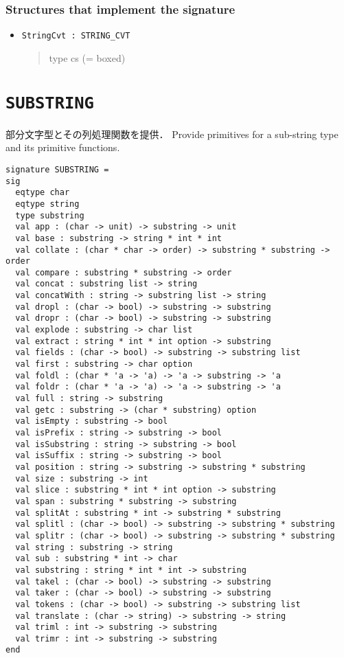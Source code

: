 \documentclass{jbook}
\newcommand{\txt}[2]{#2}
\newcommand{\code}[1]{\mbox{\large\tt #1}}
\newenvironment{program}{\begin{quote}\begin{tt}}%
                        {\end{tt}\end{quote}}
\newcommand{\signature}[2]{
\section{{\tt #1}}\label{section:reference:#2}
}
\newcommand{\Structure}{\subsubsection*{\txt{シグネチャを実装するストラクチャ}{Structures that implement the signature}}}
\begin{document}
\Structure
\begin{itemize}
\item \code{StringCvt : STRING\_CVT}
\begin{program}
    type cs (= boxed)
\end{program}
\end{itemize}

\signature{SUBSTRING}{SUBSTRING}
\ifjp%
	部分文字型とその列処理関数を提供．
\else%
	Provide primitives for a sub-string type and its primitive functions.
\fi%
\begin{verbatim}
signature SUBSTRING =
sig
  eqtype char
  eqtype string
  type substring
  val app : (char -> unit) -> substring -> unit
  val base : substring -> string * int * int
  val collate : (char * char -> order) -> substring * substring -> order
  val compare : substring * substring -> order
  val concat : substring list -> string
  val concatWith : string -> substring list -> string
  val dropl : (char -> bool) -> substring -> substring
  val dropr : (char -> bool) -> substring -> substring
  val explode : substring -> char list
  val extract : string * int * int option -> substring
  val fields : (char -> bool) -> substring -> substring list
  val first : substring -> char option
  val foldl : (char * 'a -> 'a) -> 'a -> substring -> 'a
  val foldr : (char * 'a -> 'a) -> 'a -> substring -> 'a
  val full : string -> substring
  val getc : substring -> (char * substring) option
  val isEmpty : substring -> bool
  val isPrefix : string -> substring -> bool
  val isSubstring : string -> substring -> bool
  val isSuffix : string -> substring -> bool
  val position : string -> substring -> substring * substring
  val size : substring -> int
  val slice : substring * int * int option -> substring
  val span : substring * substring -> substring
  val splitAt : substring * int -> substring * substring
  val splitl : (char -> bool) -> substring -> substring * substring
  val splitr : (char -> bool) -> substring -> substring * substring
  val string : substring -> string
  val sub : substring * int -> char
  val substring : string * int * int -> substring
  val takel : (char -> bool) -> substring -> substring
  val taker : (char -> bool) -> substring -> substring
  val tokens : (char -> bool) -> substring -> substring list
  val translate : (char -> string) -> substring -> string
  val triml : int -> substring -> substring
  val trimr : int -> substring -> substring
end
\end{verbatim}
\end{document}
